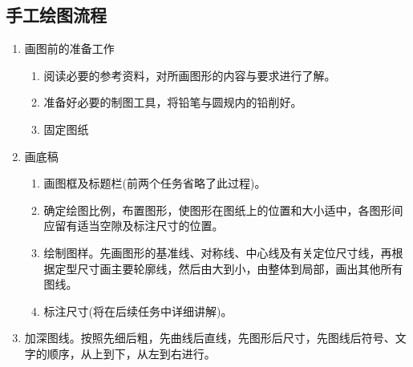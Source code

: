 \subsection{手工绘图流程}
\begin{enumerate}
\item 画图前的准备工作
    \begin{enumerate}
    \item 阅读必要的参考资料，对所画图形的内容与要求进行了解。
    \item 准备好必要的制图工具，将铅笔与圆规内的铅削好。
    \item 固定图纸
    \end{enumerate}
\item 画底稿
\begin{enumerate}
\item 画图框及标题栏(前两个任务省略了此过程)。
\item 确定绘图比例，布置图形，使图形在图纸上的位置和大小适中，各图形间应留有适当空隙及标注尺寸的位置。
\item 绘制图样。先画图形的基准线、对称线、中心线及有关定位尺寸线，再根据定型尺寸画主要轮廓线，然后由大到小，由整体到局部，画出其他所有图线。
\item 标注尺寸(将在后续任务中详细讲解)。
\end{enumerate}
\item 加深图线。按照先细后粗，先曲线后直线，先图形后尺寸，先图线后符号、文字的顺序，从上到下，从左到右进行。

\end{enumerate}
\clearpage
\endinput